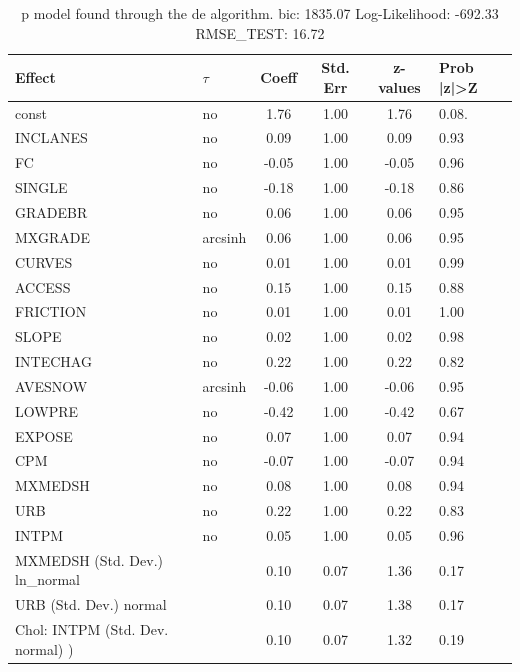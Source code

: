 \begin{table}
	\caption{p model found through the de algorithm. bic: 1835.07 Log-Likelihood: -692.33 RMSE_TEST: 16.72}
	\begin{center}
		\begin{tabular}{|l|l|c|c|c|l|}
			\hline
			Effect & $\tau$ & Coeff & Std. Err & z-values & Prob |z|>Z \\
			\hline
			const & no & 1.76 & 1.00 & 1.76 & 0.08. \\
			\hline
			INCLANES & no & 0.09 & 1.00 & 0.09 & 0.93 \\
			\hline
			FC & no & -0.05 & 1.00 & -0.05 & 0.96 \\
			\hline
			SINGLE & no & -0.18 & 1.00 & -0.18 & 0.86 \\
			\hline
			GRADEBR & no & 0.06 & 1.00 & 0.06 & 0.95 \\
			\hline
			MXGRADE & arcsinh & 0.06 & 1.00 & 0.06 & 0.95 \\
			\hline
			CURVES & no & 0.01 & 1.00 & 0.01 & 0.99 \\
			\hline
			ACCESS & no & 0.15 & 1.00 & 0.15 & 0.88 \\
			\hline
			FRICTION & no & 0.01 & 1.00 & 0.01 & 1.00 \\
			\hline
			SLOPE & no & 0.02 & 1.00 & 0.02 & 0.98 \\
			\hline
			INTECHAG & no & 0.22 & 1.00 & 0.22 & 0.82 \\
			\hline
			AVESNOW & arcsinh & -0.06 & 1.00 & -0.06 & 0.95 \\
			\hline
			LOWPRE & no & -0.42 & 1.00 & -0.42 & 0.67 \\
			\hline
			EXPOSE & no & 0.07 & 1.00 & 0.07 & 0.94 \\
			\hline
			CPM & no & -0.07 & 1.00 & -0.07 & 0.94 \\
			\hline
			MXMEDSH & no & 0.08 & 1.00 & 0.08 & 0.94 \\
			\hline
			URB & no & 0.22 & 1.00 & 0.22 & 0.83 \\
			\hline
			INTPM & no & 0.05 & 1.00 & 0.05 & 0.96 \\
			\hline
			MXMEDSH (Std. Dev.) ln_normal &  & 0.10 & 0.07 & 1.36 & 0.17 \\
			\hline
			URB (Std. Dev.) normal &  & 0.10 & 0.07 & 1.38 & 0.17 \\
			\hline
			 Chol: INTPM (Std. Dev. normal) ) &  & 0.10 & 0.07 & 1.32 & 0.19 \\
			\hline
		\end{tabular}
	\end{center}
\end{table}